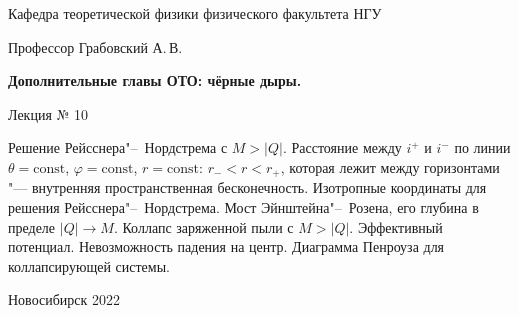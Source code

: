 \documentclass[12pt,pagesize,paper=192mm:108mm,landscape]{scrbook}
\begin{document}
\begin{titlepage}
\begin{center}
    Кафедра теоретической физики физического факультета НГУ
    \medskip

    \Large
    Профессор Грабовский А.\,В.
    \smallskip

    \Large
    \textbf{Дополнительные главы ОТО: чёрные дыры.}
    \smallskip

    \Large
    Лекция № 10
    \vfill

    \normalsize
    \begin{minipage}{0.85\linewidth}
      Решение Рейсснера"--~Нордстрема с $M>|Q|$. Расстояние между
      $i^+$ и $i^-$ по линии $\theta=\text{const}$,
      $\varphi=\text{const}$, $r=\text{const}$: $r_-<r<r_+$, которая
      лежит между горизонтами "--- внутренняя пространственная
      бесконечность. Изотропные координаты для решения
      Рейсснера"--~Нордстрема. Мост Эйнштейна"--~Розена, его глубина в
      пределе $|Q|\to M$. Коллапс заряженной пыли с $M>|Q|$. Эффективный
      потенциал. Невозможность падения на центр. Диаграмма Пенроуза
      для коллапсирующей системы.
     \end{minipage}
    \vfill

    \normalsize \ccbysa\hspace{0.5em}  Новосибирск 2022
  \end{center}
\end{titlepage}
\end{document}
